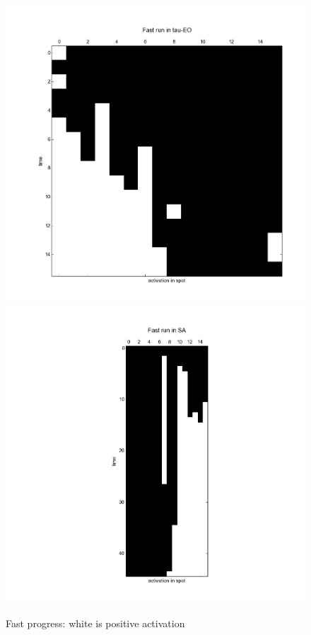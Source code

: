 \documentclass[12pt]{article}
\begin{document}
\begin{figure}
  \label{fig:fast_progess}
  \includegraphics{eo_fast}
  \includegraphics{sa_fast}
  \caption{Fast progress: white is positive activation}
\end{figure}
\end{document}
